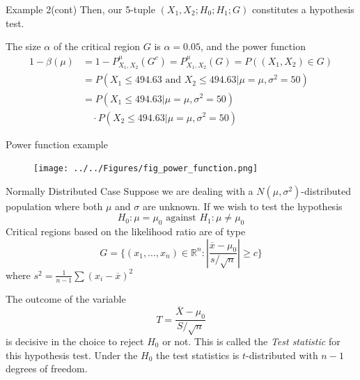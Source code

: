 \documentclass{beamer}
\begin{document}
\begin{frame}{Example 2(cont)}
	Then, our 5-tuple $(X_1,X_2;H_0;H_1;G)$ constitutes a hypothesis test. 
	
	The size $\alpha$ of the critical region $G$ is $\alpha=0.05$, and the power function
	\begin{equation*}
		\begin{split}
			1-\beta(\mu)&= 1-P^\mu_{X_1,X_2}(G^c)= P^\mu_{X_1,X_2}(G)= P((X_1,X_2)\in G)\\
			&=P(X_1 \le 494.63 \text{ and } X_2 \le 494.63| \mu=\mu, \sigma^2=50) \\
			&=P(X_1 \le 494.63 | \mu=\mu, \sigma^2=50)\\
			&\quad  \cdot P(X_2\le 494.63 | \mu=\mu, \sigma^2=50) 
		\end{split}
	\end{equation*}
\end{frame}

\begin{frame}{Power function example}
	\begin{figure}[h]
	\centering
	\texttt{[image: ../../Figures/fig\_power\_function.png]}
\end{figure}	
\end{frame}

\begin{frame}{Normally Distributed Case}
	Suppose we are dealing with a $N(\mu,\sigma^2)$-distributed population where both $\mu$ and $\sigma$ are unknown. If we wish to test the hypothesis
	\begin{equation*}
		H_0 \colon \mu=\mu_0 \text{ against } H_1 \colon \mu\ne \mu_0
	\end{equation*}
	Critical regions based on the likelihood ratio are of type
	\begin{equation*}
		G= \{(x_1,\ldots, x_n)\in \mathbb{R}^n : \left| \frac{\overline{x}-\mu_0}{s/\sqrt{n}} \right| \ge c\}
	\end{equation*}
	where $s^2= \frac{1}{n-1}\sum (x_i -\overline{x})^2$

	The outcome of the variable 
	\begin{equation*}
		T= \frac{\overline{X}-\mu_0}{S/\sqrt{n}}
	\end{equation*}
	is decisive in the choice to reject $H_0$ or not. This is called the \textit{Test statistic} for this hypothesis test. Under the $H_0$ the test statistics is $t$-distributed with $n-1$ degrees of freedom.
\end{frame}
\end{document}
